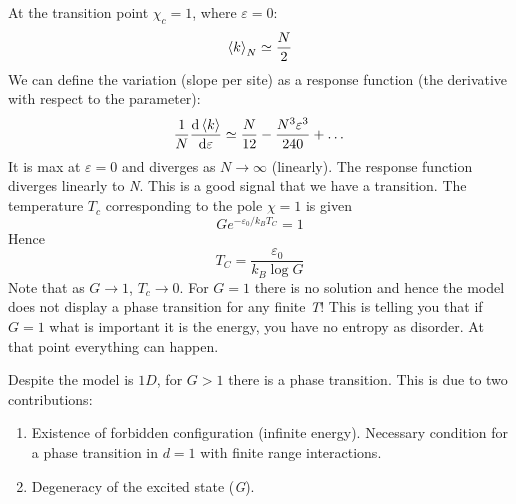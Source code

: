 \documentclass[../main/main.tex]{subfiles}
\begin{document}
At the transition point \( \chi _c =1 \), where \( \varepsilon =0 \):
\begin{equation*}
  \expval{k}_N \simeq \frac{N}{2}
\end{equation*}
We can define the variation (slope per site) as a response function (the derivative with respect to the parameter):
\begin{equation}
  \frac{1}{N}\dv{\expval{k} }{\varepsilon } \simeq \frac{N}{12} - \frac{N^3 \varepsilon ^3}{240} + \dots
\end{equation}
It is max at \( \varepsilon =0 \) and diverges as \( N \rightarrow \infty  \) (linearly). The response function diverges linearly to \emph{N}. This is a good signal that we have a transition.
The temperature \( T_c \) corresponding to the pole \( \chi=1 \) is given
  \begin{equation}
    G e^{-\varepsilon _0 /k_B T_C}  = 1
  \end{equation}
Hence
\begin{equation}
  T_C = \frac{\varepsilon _0}{k_B \log{G} }
\end{equation}
Note that as \( G \rightarrow 1 \), \( T_c \rightarrow 0 \). For \( G=1 \) there is no solution and hence the model does not display a phase transition for any finite \emph{T}! This is telling you that if \( G=1 \) what is important it is the energy, you have no entropy as disorder. At that point everything can happen.
\begin{remark}
Despite the model is \( 1D \), for \( G>1 \) there is a phase transition. This is due to two contributions:
\begin{enumerate}
\item Existence of forbidden configuration (infinite energy). Necessary condition for a phase transition in \( d=1 \) with finite range interactions.
\item Degeneracy of the excited state (\emph{G}).
\end{enumerate}
\end{remark}
\end{document}
